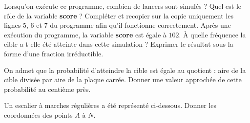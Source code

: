 \documentclass["../Cours.tex"]{subfiles}
\begin{document}
\begin{questions}
      

    \begin{scratch}[scale=0.7]
        	{
        		{
        		}
        	}
    \end{scratch}

        \subquestion Lorsqu'on exécute ce programme, combien de lancers sont simulés ?
        \subquestion Quel est le rôle de la variable \textbf{score} ?
        \subquestion Compléter et recopier sur la copie uniquement les lignes 5, 6 et 7 du programme afin qu'il fonctionne correctement.
        \subquestion Après une exécution du programme, la variable \textbf{score} est égale à $102$. À quelle fréquence la cible a-t-elle été atteinte dans cette simulation ? Exprimer le résultat sous la forme d'une fraction irréductible.
 
    \question On admet que la probabilité d'atteindre la cible est égale au quotient : aire de la cible divisée par aire de la plaque carrée. Donner une valeur approchée de cette probabilité au centième près.

    \exercice Un escalier à marches régulières a été représenté ci-dessous. Donner les coordonnées des points $A$ à $N$.


\end{questions}
\end{document}
